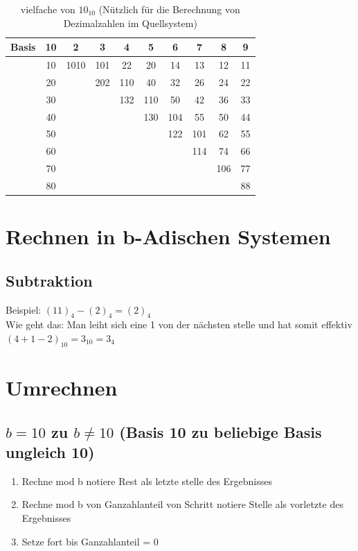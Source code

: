 \documentclass[a4paper]{article}
\begin{document}
	\begin{table}[H]
	\centering
	\caption{vielfache von $10_{10}$ (Nützlich für die Berechnung von Dezimalzahlen im Quellsystem)}
	\label{vielfacheVon10}
	\begin{tabular}{cc|c|c|c|c|c|c|c|c}
	Basis &10    & 2    & 3   & 4   & 5   & 6   & 7   & 8   & 9  \\\hline
	      &10    & 1010 & 101 & 22  & 20  & 14  & 13  & 12  & 11 \\\hline
	      &20    &      & 202 & 110 & 40  & 32  & 26  & 24  & 22 \\\hline
	      &30    &      &     & 132 & 110 & 50  & 42  & 36  & 33 \\\hline
	      &40    &      &     &     & 130 & 104 & 55  & 50  & 44 \\\hline
	      &50    &      &     &     &     & 122 & 101 & 62  & 55 \\\hline
	      &60    &      &     &     &     &     & 114 & 74  & 66 \\\hline
	      &70    &      &     &     &     &     &     & 106 & 77 \\\hline
	      &80    &      &     &     &     &     &     &     & 88
	\end{tabular}
	\end{table}

\section{Rechnen in b-Adischen Systemen}
	\subsection{Subtraktion}
		Beispiel: $(11)_4 - (2)_4 = (2)_4$\\Wie geht das: Man leiht sich eine 1 von der nächsten stelle und hat somit effektiv $(4+1-2)_{10} = 3_{10} = 3_{4}$
\section{Umrechnen}
	\subsection{\texorpdfstring{$b = 10$ zu $b \neq 10$ (Basis 10 zu beliebige Basis ungleich 10)}{Basis 10 zu b-adisch ungleich 10}}
		\begin{enumerate}
			\item Rechne mod b notiere Rest als letzte stelle des Ergebnisses
			\item Rechne mod b von Ganzahlanteil von Schritt notiere Stelle als vorletzte des Ergebnisses
			\item Setze fort bis Ganzahlanteil = 0
		\end{enumerate}
\end{document}
